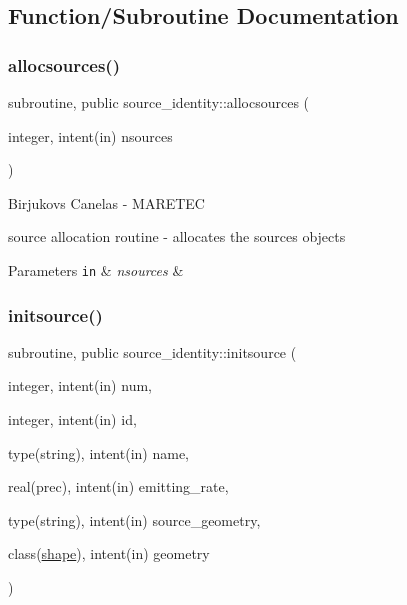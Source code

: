 \subsection{Function/\+Subroutine Documentation}
\mbox{\label{namespacesource__identity_a716b4cb4acec5756a6d4dcf20eee588e}} 
\subsubsection{\texorpdfstring{allocsources()}{allocsources()}}
{\footnotesize\ttfamily subroutine, public source\+\_\+identity\+::allocsources (\begin{DoxyParamCaption}\item[{integer, intent(in)}]{nsources }\end{DoxyParamCaption})}



Birjukovs Canelas -\/ M\+A\+R\+E\+T\+EC 

source allocation routine -\/ allocates the sources objects 
\begin{DoxyParams}[1]{Parameters}
\mbox{\tt in}  & {\em nsources} & \\
\hline
\end{DoxyParams}
\mbox{\label{namespacesource__identity_a3939e59172252d0edce57e00ea41758d}} 
\subsubsection{\texorpdfstring{initsource()}{initsource()}}
{\footnotesize\ttfamily subroutine, public source\+\_\+identity\+::initsource (\begin{DoxyParamCaption}\item[{integer, intent(in)}]{num,  }\item[{integer, intent(in)}]{id,  }\item[{type(string), intent(in)}]{name,  }\item[{real(prec), intent(in)}]{emitting\+\_\+rate,  }\item[{type(string), intent(in)}]{source\+\_\+geometry,  }\item[{class(\mbox{\hyperlink{structgeometry_1_1shape}{shape}}), intent(in)}]{geometry }\end{DoxyParamCaption})}



